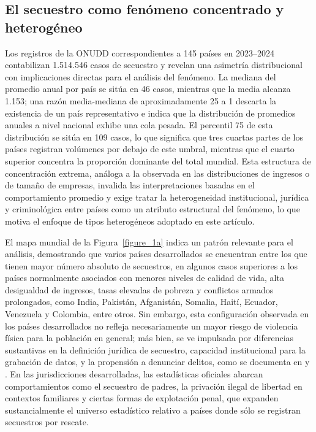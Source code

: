 \documentclass[12pt]{article}
\providecommand{\textcite}{\citet}
\theoremstyle{definition}
\theoremstyle{remark}
\newcommand{\1}{\mathbf{1}}
\begin{document}
\subsection{El secuestro como fenómeno concentrado y heterogéneo}

Los registros de la ONUDD \textcite{unodc_Data} correspondientes a 145 países en 2023--2024 contabilizan 1.514.546 casos de secuestro y revelan una asimetría distribucional con implicaciones directas para el análisis del fenómeno. La mediana del promedio anual por país se sitúa en 46 casos, mientras que la media alcanza 1.153; una razón media-mediana de aproximadamente 25 a 1 descarta la existencia de un país representativo e indica que la distribución de promedios anuales a nivel nacional exhibe una cola pesada. El percentil 75 de esta distribución se sitúa en 109 casos, lo que significa que tres cuartas partes de los países registran volúmenes por debajo de este umbral, mientras que el cuarto superior concentra la proporción dominante del total mundial. Esta estructura de concentración extrema, análoga a la observada en las distribuciones de ingresos o de tamaño de empresas, invalida las interpretaciones basadas en el comportamiento promedio y exige tratar la heterogeneidad institucional, jurídica y criminológica entre países como un atributo estructural del fenómeno, lo que motiva el enfoque de tipos heterogéneos adoptado en este artículo. 

El mapa mundial de la Figura~\ref{figure_1a} indica un patrón relevante para el análisis, demostrando que varios países desarrollados se encuentran entre los que tienen mayor número absoluto de secuestros, en algunos casos superiores a los países normalmente asociados con menores niveles de calidad de vida, alta desigualdad de ingresos, tasas elevadas de pobreza y conflictos armados prolongados, como India, Pakistán, Afganistán, Somalia, Haití, Ecuador, Venezuela y Colombia, entre otros. Sin embargo, esta configuración observada en los países desarrollados no refleja necesariamente un mayor riesgo de violencia física para la población en general; más bien, se ve impulsada por diferencias sustantivas en la definición jurídica de secuestro, capacidad institucional para la grabación de datos, y la propensión a denunciar delitos, como se documenta en \textcite{UNODC2006Manual} y \textcite{UNODC2016ICCS}. En las jurisdicciones desarrolladas, las estadísticas oficiales abarcan comportamientos como el secuestro de padres, la privación ilegal de libertad en contextos familiares y ciertas formas de explotación penal, que expanden sustancialmente el universo estadístico relativo a países donde sólo se registran secuestros por rescate.
\end{document}
